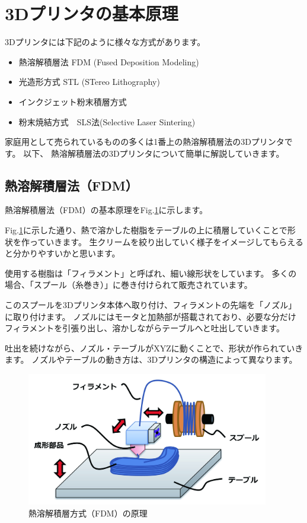 \section{3Dプリンタの基本原理}\label{dux30d7ux30eaux30f3ux30bfux306eux57faux672cux539fux7406}

3Dプリンタには下記のように様々な方式があります。

\begin{itemize}
\tightlist
\item
  熱溶解積層法 FDM (Fused Deposition Modeling)
\item
  光造形方式 STL (STereo Lithography)
\item
  インクジェット粉末積層方式
\item
  粉末焼結方式　SLS法(Selective Laser Sintering)
\end{itemize}

家庭用として売られているものの多くは1番上の熱溶解積層法の3Dプリンタです。
以下、 熱溶解積層法の3Dプリンタについて簡単に解説していきます。

\subsection{熱溶解積層法（FDM）}\label{ux71b1ux6eb6ux89e3ux7a4dux5c64ux6cd5fdm}

熱溶解積層法（FDM）の基本原理をFig.\ref{fig22}に示します。

Fig.\ref{fig22}に示した通り、熱で溶かした樹脂をテーブルの上に積層していくことで形状を作っていきます。
生クリームを絞り出していく様子をイメージしてもらえると分かりやすいかと思います。　

使用する樹脂は「フィラメント」と呼ばれ、細い線形状をしています。
多くの場合、「スプール（糸巻き）」に巻き付けられて販売されています。

このスプールを3Dプリンタ本体へ取り付け、フィラメントの先端を「ノズル」に取り付けます。
ノズルにはモータと加熱部が搭載されており、必要な分だけフィラメントを引張り出し、溶かしながらテーブルへと吐出していきます。

吐出を続けながら、ノズル・テーブルがXYZに動くことで、形状が作られていきます。
ノズルやテーブルの動き方は、3Dプリンタの構造によって異なります。

\begin{figure}[htbp]
\centering
\includegraphics[width=300pt]{fig/fig22_cmyk.jpg}
\caption{熱溶解積層方式（FDM）の原理}
\label{fig22}
\end{figure}

